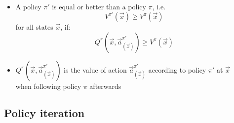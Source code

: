 \begin{frame}[label=policy_improvement] \frametitle{\subsecname}
	\begin{itemize}
		\item A policy $\pi'$ is equal or better than a policy $\pi$, i.e.
			\begin{equation*}
				V^{\pi'}(\vec x) \geq V^\pi(\vec x)
			\end{equation*}
			for all states $\vec x$, if:
			\begin{equation*}
				Q^\pi \left(\vec x, \vec a^{\pi'}_{(\vec x)} \right) \geq V^\pi(\vec x)
			\end{equation*}
		\vspace{2mm}		
		\item $Q^\pi \left(\vec x, \vec a^{\pi'}_{(\vec x)} \right)$ is the value of action $\vec a^{\pi'}_{(\vec x)}$ according to policy $\pi'$ at $\vec x$\\[3pt] when following policy $\pi$ afterwards
	\end{itemize}
	
\end{frame}

\subsection{Policy iteration}

